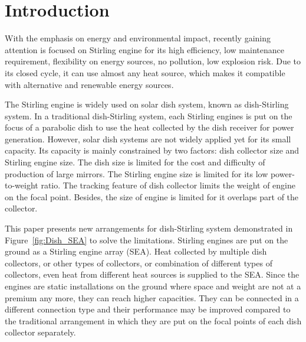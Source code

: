 \documentclass[preprint,5p, twocolumn]{elsarticle}
\begin{document}
\linenumbers

\section{Introduction}
With the emphasis on energy and environmental impact, recently gaining attention is focused on Stirling engine for its high efficiency, low maintenance requirement, flexibility on energy sources, no pollution, low explosion risk. Due to its closed cycle, it can use almost any heat source, which makes it compatible with alternative and renewable energy sources. 

The Stirling engine is widely used on solar dish system, known as dish-Stirling system. In a traditional dish-Stirling system, each Stirling engines is put on the focus of a parabolic dish to use the heat collected by the dish receiver for power generation. However, solar dish systems are not widely applied yet for its small capacity. Its capacity is mainly constrained by two factors: dish collector size and Stirling engine size. The dish size is limited for the cost and difficulty of production of large mirrors. The Stirling engine size is limited for its low power-to-weight ratio. The tracking feature of dish collector limits the weight of engine on the focal point. Besides, the size of engine is limited for it overlaps part of the collector.

This paper presents new arrangements for dish-Stirling system demonstrated in Figure~\ref{fig:Dish_SEA} to solve the limitations. Stirling engines are put on the ground as a Stirling engine array (SEA). Heat collected by multiple dish collectors, or other types of collectors, or combination of different types of collectors, even heat from different heat sources is supplied to the SEA. Since the engines are static installations on the ground where space and weight are not at a premium any more, they can reach higher capacities. They can be connected in a different connection type and their performance may be improved compared to the traditional arrangement in which they are put on the focal points of each dish collector separately.
\end{document}
